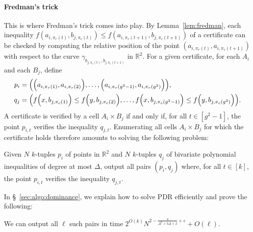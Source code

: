 \paragraph{Fredman's trick}
This is where Fredman's trick comes into play.
By Lemma~\ref{lem:fredman}, each inequality
$f(a_{i,\pi_r(t)},b_{j,\pi_c(t)}) \le f(a_{i,\pi_r(t+1)},b_{j,\pi_c(t+1)})$
of a certificate can be checked
by computing the relative position of
the point $(a_{i,\pi_r(t)},a_{i,\pi_r(t+1)})$ with
respect to the curve $\gamma_{b_{j,\pi_c(t)},b_{j,\pi_c(t+1)}}$ in
\(\mathbb{R}^2\).
For a given certificate, for each $A_i$ and each $B_j$, define
%
\begin{align*}
p_i &= \mleft(
    \Big(a_{i,\pi_r(1)},a_{i,\pi_r(2)}\Big),
    \ldots,
    \Big(a_{i,\pi_r(g^2-1)},a_{i,\pi_r(g^2)}\Big)
\mright),\\
q_j &= \mleft(
    f\Big(x,b_{j,\pi_c(1)}\Big) \le f\Big(y,b_{j,\pi_c(2)}\Big),
    \ldots,
    f\Big(x,b_{j,\pi_c(g^2-1)}\Big) \le f\Big(y,b_{j,\pi_c(g^2)}\Big)
\mright).
\end{align*}
%
A certificate is verified by a cell $A_i \times B_j$ if and only if, for all
$t \in [g^2-1]$, the point $p_{i,t}$ verifies the inequality $q_{j,t}$.
Enumerating all cells $A_i\times B_j$ for which the
certificate holds therefore amounts to solving the following problem:
%
\begin{problem}
Given $N$ $k$-tuples $p_i$ of points in $\mathbb{R}^2$ and $N$ $k$-tuples $q_j$
of bivariate polynomial inequalities of degree at most $\Delta$,
output all pairs $(p_i,q_j)$ where, for all $t \in [k]$,
the point $p_{i,t}$ verifies the inequality $q_{j,t}$.
\end{problem}
%
In \S~\ref{sec:algo:dominance}, we explain how to solve PDR efficiently
and prove the following:
\begin{lemma}\label{lem:dominance}
    We can output
    all $\ell$ such pairs in time
    $2^{O(k)} N^{2-\frac{4}{\Delta^2+3\Delta+2}+\varepsilon} + O(\ell)$.
\end{lemma}

